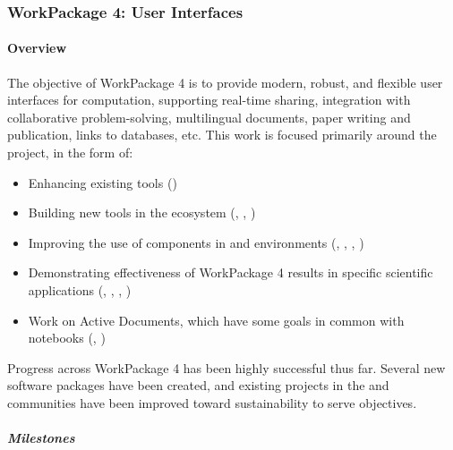 \subsubsection{WorkPackage 4: User Interfaces}

\paragraph{Overview}

The objective of WorkPackage 4 is to provide modern, robust, and flexible user interfaces for
computation, supporting real-time sharing, integration with collaborative problem-solving,
multilingual documents, paper writing and publication, links to databases, etc. This work is focused primarily around the \Jupyter project, in the form of:

\begin{itemize}
    \item Enhancing existing \Jupyter tools ()
    \item Building new tools in the \Jupyter ecosystem (, , )
    \item Improving the use of \ODK components in \Jupyter and \Sage environments (, , , )
    \item Demonstrating effectiveness of WorkPackage 4 results in specific scientific applications (, , , )
    \item Work on Active Documents, which have some goals in common with \Jupyter notebooks (, )
\end{itemize}

Progress across WorkPackage 4 has been highly successful thus far.
Several new software packages have been created,
and existing projects in the \Sage and \Jupyter communities have been improved toward sustainability to serve \ODK objectives.

\subparagraph{Milestones}

